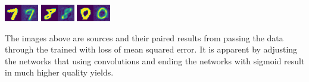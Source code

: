 \documentclass{article}
\begin{document}
\begin{multicols}{2}
\begin{multicols}{3}
\includegraphics[width=\columnwidth]{./vae-images/C.png}
\includegraphics[width=\columnwidth]{./vae-images/E.png}
\includegraphics[width=\columnwidth]{./vae-images/I.png}
\end{multicols}

The images above are sources and their paired results from passing the \mnist data through
the trained \vae with loss of mean squared error. It is apparent by adjusting the networks
that using convolutions and ending the networks with sigmoid result in much higher quality
yields.





\end{multicols}
\end{document}
